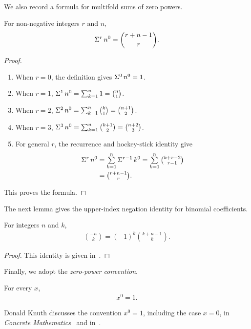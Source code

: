 We also record a formula for multifold sums of zero powers.
\begin{lemma}
  \label{lem:multifold-sum-of-zero-powers}
  For non-negative integers $r$ and $n$,
  \begin{align*}
    \Sigma^{r}\,{n}^{0} = \binom{r+n-1}{r}.
  \end{align*}
  \begin{proof}
    \begin{enumerate}
      \item When $r=0$, the definition gives $\Sigma^{0}\,{n}^{0} = 1$.
      \item When $r=1$,
        $\Sigma^{1}\,{n}^{0}
        = \mathop{\textstyle\sum}_{k=1}^{n} 1 = \tbinom{n}{1}$.
      \item When $r=2$,
        $\Sigma^{2}\,{n}^{0}
        = \mathop{\textstyle\sum}_{k=1}^{n} \tbinom{k}{1}
        = \tbinom{n+1}{2}$.
      \item When $r=3$,
        $\Sigma^{3}\,{n}^{0}
        = \mathop{\textstyle\sum}_{k=1}^{n} \tbinom{k+1}{2}
        = \tbinom{n+2}{3}$.
      \item For general $r$, the recurrence and hockey-stick identity give
        \begin{align*}
          \Sigma^{r}\,{n}^{0}
          &= \mathop{\textstyle\sum}_{k=1}^{n} \Sigma^{r-1}\,{k}^{0}
           = \mathop{\textstyle\sum}_{k=1}^{n} \tbinom{k+r-2}{r-1} \\
          &= \tbinom{r+n-1}{r}.
        \end{align*}
    \end{enumerate}
    This proves the formula.
  \end{proof}
\end{lemma}

The next lemma gives the upper-index negation identity for binomial coefficients.
\begin{lemma}
  \label{lem:upper-binomial-negation}
  For integers $n$ and $k$,
  \begin{align*}
    \binom{-n}{k} = (-1)^{k} \binom{k+n-1}{k}.
  \end{align*}
  \begin{proof}
    This identity is given in~\cite[p. 164, Equation~(5.14)]{graham1994concrete}.
  \end{proof}
\end{lemma}

Finally, we adopt the \emph{zero-power convention}.
\begin{convention}
  For every $x$,
  \begin{align*}
    x^0 = 1.
  \end{align*}
\end{convention}
Donald Knuth discusses the convention $x^0=1$, including the case $x=0$, in \emph{Concrete Mathematics}~\cite[p. 162]{graham1994concrete} and in~\cite{knuth1992notesnotation}.
